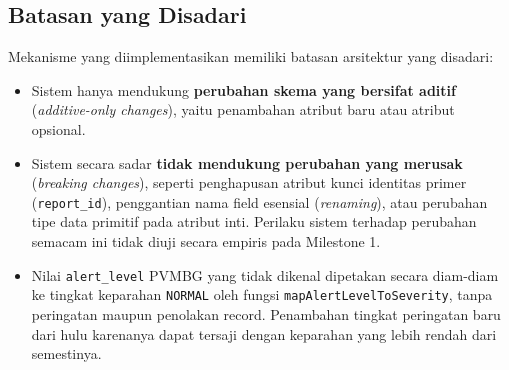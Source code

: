 \subsection{Batasan yang Disadari}
Mekanisme yang diimplementasikan memiliki batasan arsitektur yang disadari:
\begin{itemize}
    \item Sistem hanya mendukung \textbf{perubahan skema yang bersifat aditif} (\textit{additive-only changes}), yaitu penambahan atribut baru atau atribut opsional.
    \item Sistem secara sadar \textbf{tidak mendukung perubahan yang merusak} (\textit{breaking changes}), seperti penghapusan atribut kunci identitas primer (\texttt{report\_id}), penggantian nama field esensial (\textit{renaming}), atau perubahan tipe data primitif pada atribut inti. Perilaku sistem terhadap perubahan semacam ini tidak diuji secara empiris pada Milestone 1.
    \item Nilai \texttt{alert\_level} PVMBG yang tidak dikenal dipetakan secara diam-diam ke tingkat keparahan \texttt{NORMAL} oleh fungsi \texttt{mapAlertLevelToSeverity}, tanpa peringatan maupun penolakan record. Penambahan tingkat peringatan baru dari hulu karenanya dapat tersaji dengan keparahan yang lebih rendah dari semestinya.
\end{itemize}

